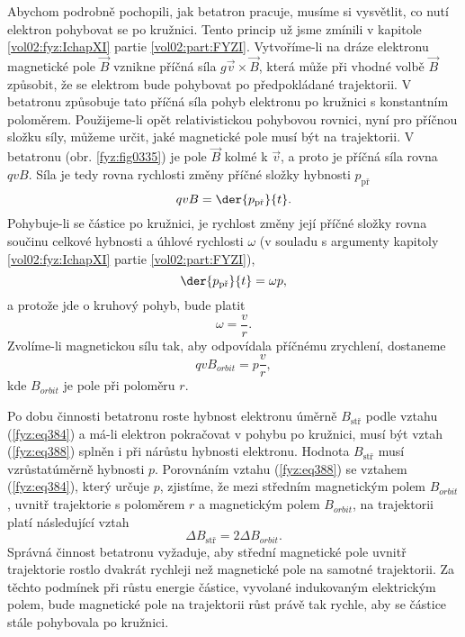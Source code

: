   Abychom podrobně pochopili, jak betatron pracuje, musíme si vysvětlit, co nutí elektron 
  pohybovat se po kružnici. Tento princip už jsme zmínili v kapitole \ref{vol02:fyz:IchapXI} partie 
  \ref{vol02:part:FYZI}. Vytvoříme-li na dráze elektronu magnetické pole \(\vec{B}\) vznikne příčná síla 
  \(g\vec{v}\times\vec{B}\), která může při vhodné volbě \(\vec{B}\) způsobit, že se elektrom bude 
  pohybovat po předpokládané trajektorii. V betatronu způsobuje tato příčná síla pohyb elektronu 
  po kružnici s konstantním poloměrem. Použijeme-li opět relativistickou pohybovou rovnici, nyní 
  pro příčnou složku síly, můžeme určit, jaké magnetické pole musí být na trajektorii. V betatronu 
  (obr. \ref{fyz:fig0335}) je pole \(\vec{B}\) kolmé k \(\vec{v}\), a proto je příčná síla 
  rovna \(qvB\). Síla je tedy rovna rychlosti změny příčné složky hybnosti \(p_\text{př}\)
  \begin{equation}\label{fyz:eq385}
    qvB = \der{p_{\text{př}}}{t}.
  \end{equation}
  Pohybuje-li se částice po kružnici, je rychlost změny její příčné složky rovna součinu celkové 
  hybnosti a úhlové rychlosti \(\omega\) (v souladu s argumenty kapitoly \ref{vol02:fyz:IchapXI} partie 
  \ref{vol02:part:FYZI}),
  \begin{equation}\label{fyz:eq386}
    \der{p_{\text{př}}}{t} = \omega p, 
  \end{equation}
  a protože jde o kruhový pohyb, bude platit
  \begin{equation}\label{fyz:eq387}
    \omega = \frac{v}{r}. 
  \end{equation}
  Zvolíme-li magnetickou sílu tak, aby odpovídala příčnému zrychlení, dostaneme
  \begin{equation}\label{fyz:eq388}
    qvB_{orbit} = p\frac{v}{r},
  \end{equation}
  kde \(B_{orbit}\) je pole při poloměru \(r\). 
  
  Po dobu činnosti betatronu roste hybnost elektronu úměrně \(B_{\text{stř}}\) podle vztahu 
  (\ref{fyz:eq384}) a má-li elektron pokračovat v pohybu po kružnici, musí být vztah 
  (\ref{fyz:eq388}) splněn i při nárůstu hybnosti elektronu. Hodnota \(B_{\text{stř}}\) musí 
  vzrůstatúměrně hybnosti \(p\). Porovnáním vztahu (\ref{fyz:eq388}) se vztahem (\ref{fyz:eq384}), 
  který určuje \(p\), zjistíme, že mezi středním magnetickým polem \(B_{orbit}\), uvnitř 
  trajektorie s poloměrem \(r\) a magnetickým polem \(B_{orbit}\), na trajektorii platí následující 
  vztah
  \begin{equation}\label{fyz:eq389}
    \Delta B_{\text{stř}} = 2\Delta B_{orbit}.
  \end{equation}
  Správná činnost betatronu vyžaduje, aby střední magnetické pole uvnitř trajektorie rostlo dvakrát 
  rychleji než magnetické pole na samotné trajektorii. Za těchto podmínek při růstu energie 
  částice, vyvolané indukovaným elektrickým polem, bude magnetické pole na trajektorii růst právě 
  tak rychle, aby se částice stále pohybovala po kružnici. 
  
